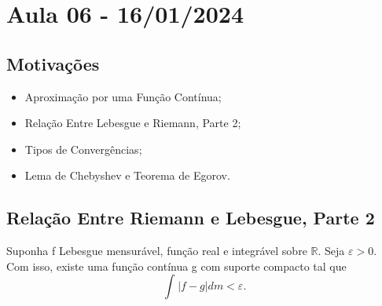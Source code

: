 \documentclass[measure_theory.tex]{subfiles}
\begin{document}
\section{Aula 06 - 16/01/2024}
\subsection{Motivações}
\begin{itemize}
	\item Aproximação por uma Função Contínua;
	\item Relação Entre Lebesgue e Riemann, Parte 2;
	\item Tipos de Convergências;
	\item Lema de Chebyshev e Teorema de Egorov.
\end{itemize}
\subsection{Relação Entre Riemann e Lebesgue, Parte 2}
\begin{theorem*}
	Suponha f Lebesgue mensurável, função real e integrável sobre \(\mathbb{R}.\) Seja \(\varepsilon >0\).
	Com isso, existe uma função contínua g com suporte compacto tal que
	\[
		\int_{}|f-g| dm < \varepsilon .
	\]
\end{theorem*}
\end{document}
